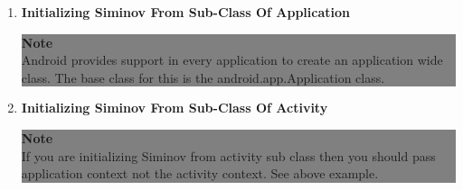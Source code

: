 \begin{enumerate}

	\item \small \textbf{Initializing Siminov From Sub-Class Of Application}

		
	
		\begin{center}
			\colorbox{grey}{
				\parbox[t]{.8\linewidth}{
					\fontsize{11pt}{11pt}\selectfont %
					\vspace*{0.1cm} %
		
					\hfill \textbf{Note} \\

					Android provides support in every application to create an application wide class. The base class for this is the android.app.Application class. 

					\vspace*{0.0cm} %
				}
			}

		\end{center}

	\item \small \textbf{Initializing Siminov From Sub-Class Of Activity}

		


		\begin{center}
			\colorbox{grey}{
				\parbox[t]{.8\linewidth}{
					\fontsize{11pt}{11pt}\selectfont %
					\vspace*{0.1cm} %
		
					\hfill \textbf{Note} \\

					If you are initializing Siminov from activity sub class then you should pass application context not the activity context. See above example.

					\vspace*{0.0cm} %
				}
			}

		\end{center}


\end{enumerate}



